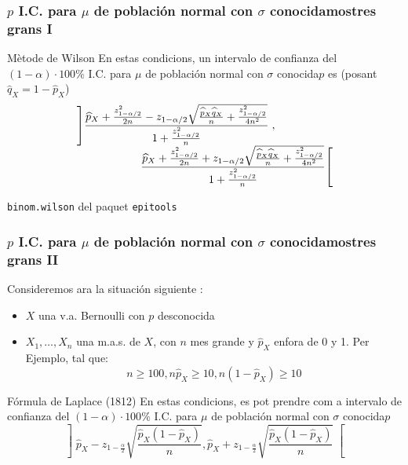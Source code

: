 \documentclass[12pt,t]{beamer}\usepackage[]{graphicx}\usepackage[]{color}
\renewcommand{\geq}{\geqslant}
\theoremstyle{plain}
\theoremstyle{definition}
\begin{document}
\begin{frame}
\frametitle{$p$ I.C. para $\mu$ de población normal con $\sigma$ conocidamostres grans I}
\begin{block}{Mètode de Wilson}
En estas  condicions, un intervalo  de confianza  del $(1-\alpha)\cdot 100\%$ I.C. para $\mu$ de población normal con $\sigma$ conocida$p$
es (posant $\widehat{q}_{X}=1-\widehat{p}_{X}$)
$$
\begin{array}{l}
\displaystyle \left]\frac{\widehat{p}_{X}+\frac{z_{1-{\alpha}/{2}}^2}{2n}-z_{1-{\alpha}/{2}}\sqrt{\frac{\widehat{p}_{X}\widehat{q}_{X}}{n}+\frac{z_{1-{\alpha}/{2}}^2}{4n^2}}}{1+\frac{z_{1-{\alpha}/{2}}^2}{n}}\right.,\\[2ex]
\hspace*{2cm} \displaystyle \left.\frac{\widehat{p}_{X}+\frac{z_{1-{\alpha}/{2}}^2}{2n}+z_{1-{\alpha}/{2}}\sqrt{\frac{\widehat{p}_{X}\widehat{q}_{X}}{n}+\frac{z_{1-{\alpha}/{2}}^2}{4n^2}}}{1+\frac{z_{1-{\alpha}/{2}}^2}{n}}\right[
\end{array}
$$
\end{block}
\medskip

\texttt{binom.wilson} del paquet \texttt{epitools}
\end{frame}



\begin{frame}
\frametitle{$p$ I.C. para $\mu$ de población normal con $\sigma$ conocidamostres grans II}

Consideremos ara la situación siguiente  :
\begin{itemize}
\item  $X$ una v.a. Bernoulli con $p$ desconocida

\item $X_1,\ldots,X_n$ una m.a.s. de $X$, con $n$ mes grande y $\widehat{p}_{X}$ enfora de 0 y 1. Per Ejemplo, tal que:
$$
n\geq 100, n\widehat{p}_{X}\geq 10,  n(1-\widehat{p}_{X})\geq 10
$$
\end{itemize}
\medskip



\begin{block}{Fórmula de Laplace (1812)}
En estas  condicions, es pot prendre com a intervalo  de confianza  del $(1-\alpha)\cdot 100\%$ I.C. para $\mu$ de población normal con $\sigma$ conocida$p$
$$
\left]\widehat{p}_{X}-z_{1-\frac{\alpha}{2}}\sqrt{\frac{\widehat{p}_{X}
(1-\widehat{p}_{X})}{n}},
\widehat{p}_{X}+z_{1-\frac{\alpha}{2}}\sqrt{\frac{\widehat{p}_{X}
(1-\widehat{p}_{X})}{n}}\right[$$
\end{block}
\end{frame}
\end{document}
